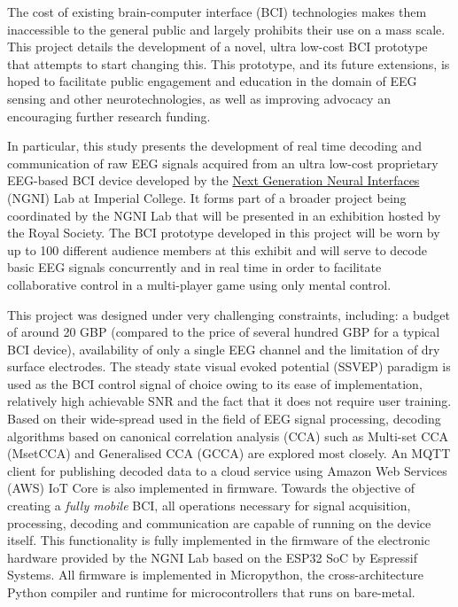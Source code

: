 \noindent
The cost of existing brain-computer interface (BCI) technologies makes them inaccessible to the general public and largely prohibits their use on a mass scale. This project details the development of a novel, ultra low-cost BCI prototype that attempts to start changing this. This prototype, and its future extensions, is hoped to facilitate public engagement and education in the domain of EEG sensing and other neurotechnologies, as well as improving advocacy an encouraging further research funding.
\vspace{0.4cm}

\noindent
In particular, this study presents the development of real time decoding and communication of raw EEG signals acquired from an ultra low-cost proprietary EEG-based BCI device developed by the \href{https://www.imperial.ac.uk/next-generation-neural-interfaces/}{Next Generation Neural Interfaces} (NGNI) Lab at Imperial College. It forms part of a broader project being coordinated by the NGNI Lab that will be presented in an exhibition hosted by the Royal Society. The BCI prototype developed in this project will be worn by up to 100 different audience members at this exhibit and will serve to decode basic EEG signals concurrently and in real time in order to facilitate collaborative control in a multi-player game using only mental control.
\vspace{0.4cm}

\noindent
This project was designed under very challenging constraints, including: a budget of around 20 GBP (compared to the price of several hundred GBP for a typical BCI device), availability of only a single EEG channel and the limitation of dry surface electrodes. The steady state visual evoked potential (SSVEP) paradigm is used as the BCI control signal of choice owing to its ease of implementation, relatively high achievable SNR and the fact that it does not require user training. Based on their wide-spread used in the field of EEG signal processing, decoding algorithms based on canonical correlation analysis (CCA) such as Multi-set CCA (MsetCCA) and Generalised CCA (GCCA) are explored most closely. An MQTT client for publishing decoded data to a cloud service using Amazon Web Services (AWS) IoT Core is also implemented in firmware. Towards the objective of creating a \textit{fully mobile} BCI, all operations necessary for signal acquisition, processing, decoding and communication are capable of running on the device itself. This functionality is fully implemented in the firmware of the electronic hardware provided by the NGNI Lab based on the ESP32 SoC by Espressif Systems. All firmware is implemented in Micropython, the cross-architecture Python compiler and runtime for microcontrollers that runs on bare-metal.
\vspace{0.4cm}

